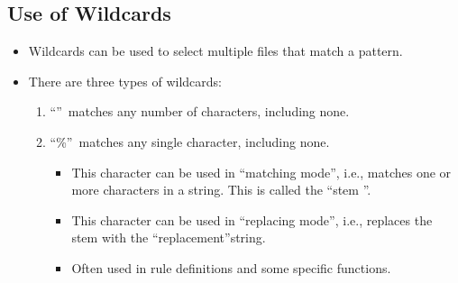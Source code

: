 \subsection{Use of Wildcards}

\begin{itemize}
    \item Wildcards can be used to select multiple files that match a pattern.
    \item There are three types of wildcards:
    \begin{enumerate}
        \item \textquotedblleft *\textquotedblright\ matches any number of
        characters, including none.
        \item \textquotedblleft \%\textquotedblright\ matches any single
        character, including none.
        \begin{itemize}
            \item This character can be used in \textquotedblleft matching
            mode\textquotedblright , i.e., matches one or more characters in
            a string. This is called the \textquotedblleft stem
            \textquotedblright.
            \item This character can be used in \textquotedblleft replacing
            mode\textquotedblright , i.e., replaces the stem with the\linebreak
            \textquotedblleft replacement\textquotedblright string.
            \item Often used in rule definitions and some specific functions.
        \end{itemize}
    \end{enumerate}
\end{itemize}

